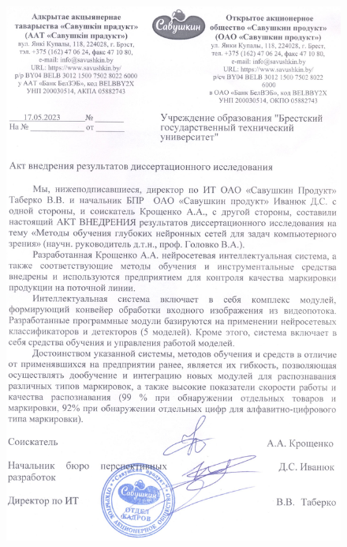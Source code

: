 \begin{figure}[ht]
	\centering
	\includegraphics[height=20cm]{man-source/images/appendix/appendixActs/act_Savushkin.jpg}
\end{figure}


